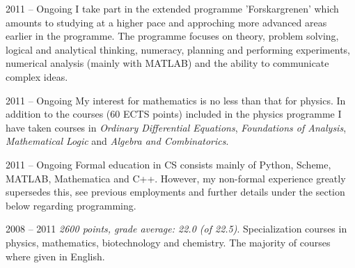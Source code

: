 
      {2011 -- Ongoing}
      {I take part in the extended programme 'Forskargrenen' which amounts to
       studying at a higher pace and approching more advanced areas earlier
       in the programme. The programme focuses on theory, problem solving, logical and analytical
       thinking, numeracy, planning and performing experiments,
       numerical analysis (mainly with MATLAB) and the ability to communicate
       complex ideas.}

      {2011 -- Ongoing}
      {My interest for mathematics is no less than that for physics.
       In addition to the courses (60 ECTS points) included in the physics
       programme I have taken courses in \emph{Ordinary Differential Equations},
       \emph{Foundations of Analysis}, \emph{Mathematical Logic} and
       \emph{Algebra and Combinatorics}.}

      {2011 -- Ongoing}
      {Formal education in CS consists mainly of Python, Scheme, MATLAB, Mathematica and C++.
       However, my non-formal experience greatly supersedes this, see
       previous employments and further details under the section below regarding programming.}

      {2008 -- 2011}
      {\textit{2600 points, grade average: 22.0 (of 22.5)}. Specialization courses in physics, mathematics,
       biotechnology and chemistry. The majority of courses where given in English.}
